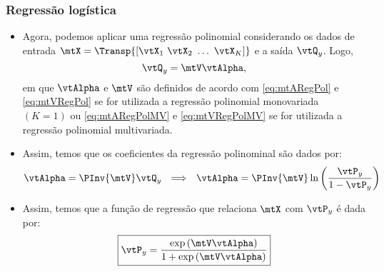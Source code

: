 \begin{frame}
	\frametitle{Regressão logística}
	\begin{itemize}
		\item Agora, podemos aplicar uma regressão polinomial considerando os dados de entrada $\mtX = \Transp{\left[\vtX_1 \,\, \vtX_2 \,\, \dots \,\, \vtX_K\right]}$ e a saída $\vtQ_y$. Logo,
		\begin{equation}
			\vtQ_y = \mtV \vtAlpha,
		\end{equation}
		em que $\vtAlpha$ e $\mtV$ são definidos de acordo com \eqref{eq:mtARegPol} e \eqref{eq:mtVRegPol} se for utilizada a regressão polinomial monovariada $(K=1)$ ou \eqref{eq:mtARegPolMV} e \eqref{eq:mtVRegPolMV} se for utilizada a regressão polinomial multivariada.
		\item Assim, temos que os coeficientes da regressão polinominal são dados por:
		\begin{equation}
			\vtAlpha = \PInv{\mtV} \vtQ_y \,\,\,\, \Longrightarrow \,\,\,\, \vtAlpha = \PInv{\mtV} \ln\left(\dfrac{\vtP_y}{1 - \vtP_y}\right)
		\end{equation}
		\item Assim, temos que a função de regressão que relaciona $\mtX$ com $\vtP_y$ é dada por:
		\begin{equation}
			\boxed{\vtP_y = \dfrac{\exp\left(\mtV \vtAlpha\right)}{1 + \exp\left(\mtV \vtAlpha\right)}}
		\end{equation}
	\end{itemize}
\end{frame}